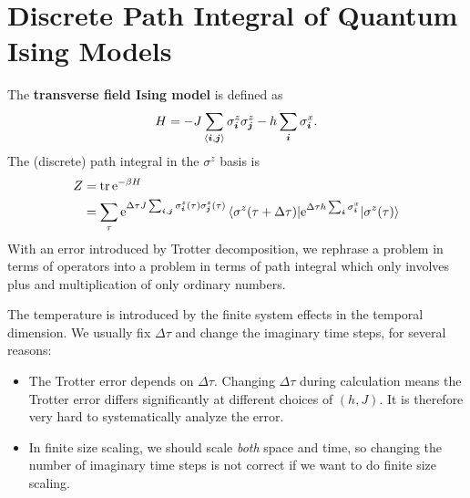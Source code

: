 \documentclass[hyperref, a4paper]{article}
\newcommand*{\ee}{\mathrm{e}}
\newcommand*{\pair}[1]{\langle #1 \rangle}
\newcommand*{\concept}[1]{{\textbf{#1}}}
\begin{document}
\section{Discrete Path Integral of Quantum Ising Models}

The \concept{transverse field Ising model} is defined as 
\begin{equation}
    H = -J \sum_{\pair{\vb*{i}, \vb*{j}}} \sigma^z_{\vb*{i}} \sigma^z_{\vb*{j}} - h \sum_{\vb*{i}} \sigma^x_{\vb*{i}}.
\end{equation}
The (discrete) path integral in the $\sigma^z$ basis is 
\begin{equation}
    \begin{aligned}
        Z &= \trace \ee^{-\beta H} \\
        &= \sum_\tau \ee^{\Delta\tau J \sum_{\vb*{i}, \vb*{j}} \sigma^z_{\vb*{i}}(\tau) \sigma^z_{\vb*{j}}(\tau)} \mel{\sigma^z(\tau + \Delta\tau)}{\ee^{\Delta\tau h \sum_{\vb*{i}} \sigma^x_{\vb*{i}}}}{\sigma^z(\tau)}
    \end{aligned}
\end{equation}
With an error introduced by Trotter decomposition, we rephrase a problem in terms of operators into a problem in terms of path integral which only involves plus and multiplication of only ordinary numbers.

The temperature is introduced by the finite system effects in the temporal dimension. 
We usually fix $\Delta \tau$ and change the imaginary time steps, for several reasons:
\begin{itemize}
    \item The Trotter error depends on $\Delta \tau$. Changing $\Delta \tau$ during calculation means the Trotter error differs significantly at different choices of $(h, J)$.
    It is therefore very hard to systematically analyze the error.
    \item In finite size scaling, we should scale \emph{both} space and time, so changing the number of imaginary time steps is not correct if we want to do finite size scaling.  
\end{itemize}
\end{document}
